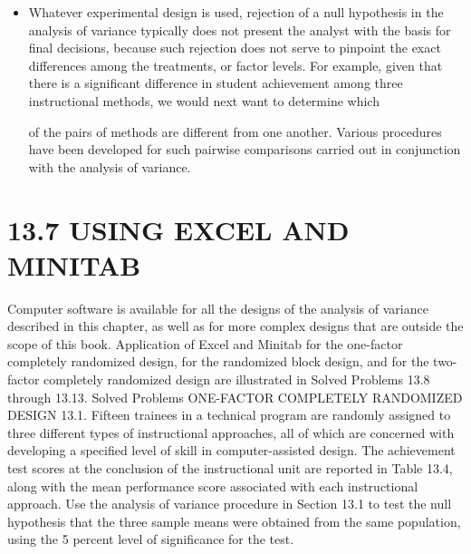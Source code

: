 \documentclass[]{article}
\begin{document}
\begin{itemize}
\item Whatever experimental design is used, rejection of a null hypothesis in the analysis of variance typically
does not present the analyst with the basis for final decisions, because such rejection does not serve to pinpoint
the exact differences among the treatments, or factor levels. For example, given that there is a significant
difference in student achievement among three instructional methods, we would next want to determine which

of the pairs of methods are different from one another. Various procedures have been developed for such
pairwise comparisons carried out in conjunction with the analysis of variance.
\end{itemize}
\section{13.7 USING EXCEL AND MINITAB}
Computer software is available for all the designs of the analysis of variance described in this chapter, as
well as for more complex designs that are outside the scope of this book. Application of Excel and Minitab for
the one-factor completely randomized design, for the randomized block design, and for the two-factor
completely randomized design are illustrated in Solved Problems 13.8 through 13.13.
Solved Problems
ONE-FACTOR COMPLETELY RANDOMIZED DESIGN
13.1. Fifteen trainees in a technical program are randomly assigned to three different types of instructional
approaches, all of which are concerned with developing a specified level of skill in computer-assisted
design. The achievement test scores at the conclusion of the instructional unit are reported in Table 13.4,
along with the mean performance score associated with each instructional approach. Use the analysis of
variance procedure in Section 13.1 to test the null hypothesis that the three sample means were obtained
from the same population, using the 5 percent level of significance for the test.
\end{document}
